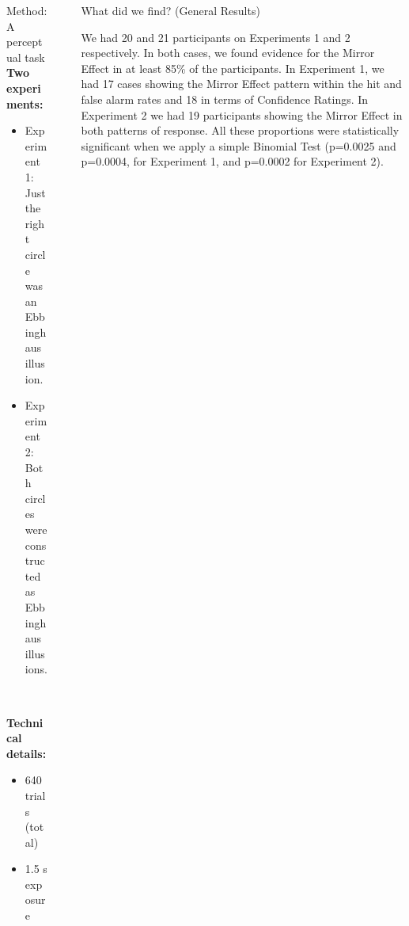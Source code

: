 \documentclass[final]{beamer}
\newlength{\sepwid}
\newlength{\onecolwid}
\newlength{\twocolwid}
\begin{document}
\begin{frame}[t]
\begin{columns}[t]
\begin{column}{\onecolwid}
\begin{alertblock}{Method: A perceptual task}
\textbf{Two experiments:} 

\begin{itemize}
\item Experiment 1: Just the right circle was an Ebbinghaus illusion.
\item Experiment 2: Both circles were constructed as Ebbinghaus illusions.
\end{itemize}

$\qquad$

\textbf{Technical details:} 

\begin{itemize}
\item 640 trials (total)
\item 1.5 s exposure
\end{itemize}
\end{alertblock}


\end{column} %

\begin{column}{\sepwid}\end{column} %

\begin{column}{\twocolwid} %



\begin{alertblock}{What did we find? (General Results)}

We had 20 and 21 participants on Experiments 1 and 2 respectively. In both cases, we found evidence for the Mirror Effect in at least 85\% of the participants. In Experiment 1, we had 17 cases showing the Mirror Effect pattern within the hit and false alarm rates and 18 in terms of Confidence Ratings. In Experiment 2 we had 19 participants showing the Mirror Effect in both patterns of response. All these proportions were statistically significant when we apply a simple Binomial Test (p=0.0025 and p=0.0004, for Experiment 1, and p=0.0002 for Experiment 2).


\end{alertblock}
\end{column}
\end{columns}
\end{frame}
\end{document}
